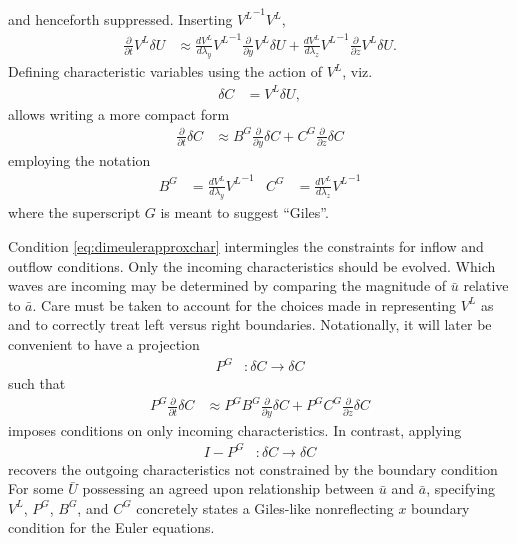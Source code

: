 \documentclass[letterpaper,11pt,nointlimits,reqno,draft]{amsbook}
\begin{document}
and henceforth suppressed.  Inserting ${V^L}^{-1} V^L$,
\begin{align}
  \frac{\partial}{\partial{}t}
  V^L
  \delta{}U
  &\approx
  \frac{dV^L}{d\lambda_y}
  {V^L}^{-1}
  \frac{\partial}{\partial{}y}
  V^L
  \delta{}U
  +
  \frac{dV^L}{d\lambda_z}
  {V^L}^{-1}
  \frac{\partial}{\partial{}z}
  V^L
  \delta{}U
.
\end{align}
Defining characteristic variables using the action of $V^L$, viz.
\begin{align}
  \delta{}C &= V^L \delta{}U
  ,
\end{align}
allows writing a more compact form
\begin{align}
  \frac{\partial}{\partial{}t}
  \delta{}C
  &\approx
  B^G
  \frac{\partial}{\partial{}y}
  \delta{}C
  +
  C^G
  \frac{\partial}{\partial{}z}
  \delta{}C
\end{align}
employing the notation
\begin{align}
  B^G
&=
  \frac{dV^L}{d\lambda_y}
  {V^L}^{-1}
&
  C^G
&=
  \frac{dV^L}{d\lambda_z}
  {V^L}^{-1}
\end{align}
where the superscript $G$ is meant to suggest ``Giles''.

Condition \eqref{eq:dimeulerapproxchar} intermingles the constraints for
inflow and outflow conditions.  Only the incoming characteristics should be
evolved.  Which waves are incoming may be determined by comparing the magnitude
of $\bar{u}$ relative to $\bar{a}$.  Care must be taken to account for the
choices made in representing $V^L$ as and to correctly treat left versus right
boundaries.  Notationally, it will later be convenient to have a
projection
\begin{align}
\label{eq:PG}
  P^G
  &:
  \delta{C} \to \delta{C}
\end{align}
such that
\begin{align}
\label{eq:dimeulerapproxchar}
  P^G
  \frac{\partial}{\partial{}t}
  \delta{}C
  &\approx
  P^G B^G
  \frac{\partial}{\partial{}y}
  \delta{}C
  +
  P^G C^G
  \frac{\partial}{\partial{}z}
  \delta{}C
\end{align}
imposes conditions on only incoming characteristics.  In contrast, applying
\begin{align}
 I - P^G
 &:
 \delta{C} \to \delta{C}
\end{align}
recovers the outgoing characteristics not constrained by the boundary condition
For some $\bar{U}$ possessing an agreed upon relationship between $\bar{u}$ and
$\bar{a}$, specifying $V^L$, $P^G$, $B^G$, and $C^G$ concretely states a
Giles-like nonreflecting $x$ boundary condition for the Euler equations.
\end{document}
